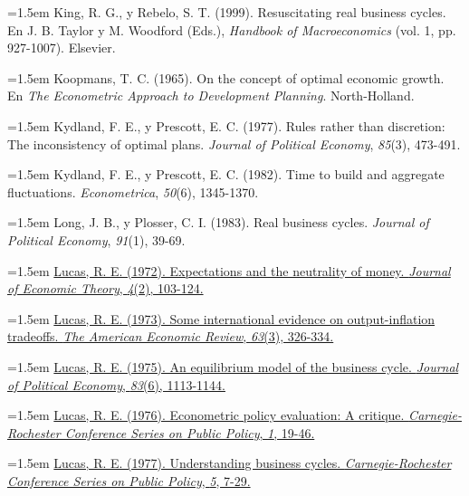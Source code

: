 \documentclass[10pt,a4paper]{article}
\begin{document}
\noindent\hangindent=1.5em King, R. G., y Rebelo, S. T. (1999). Resuscitating real business cycles. En J. B. Taylor y M. Woodford (Eds.), \textit{Handbook of Macroeconomics} (vol. 1, pp. 927-1007). Elsevier.

\noindent\hangindent=1.5em Koopmans, T. C. (1965). On the concept of optimal economic growth. En \textit{The Econometric Approach to Development Planning}. North-Holland.

\noindent\hangindent=1.5em Kydland, F. E., y Prescott, E. C. (1977). Rules rather than discretion: The inconsistency of optimal plans. \textit{Journal of Political Economy}, \textit{85}(3), 473-491.

\noindent\hangindent=1.5em Kydland, F. E., y Prescott, E. C. (1982). Time to build and aggregate fluctuations. \textit{Econometrica}, \textit{50}(6), 1345-1370.

\noindent\hangindent=1.5em Long, J. B., y Plosser, C. I. (1983). Real business cycles. \textit{Journal of Political Economy}, \textit{91}(1), 39-69.

\noindent\hangindent=1.5em \href{https://www.almendron.com/tribuna/wp-content/uploads/2019/01/expectations-and-the-neutrality-of-money-2.pdf}{Lucas, R. E. (1972). Expectations and the neutrality of money. \textit{Journal of Economic Theory}, \textit{4}(2), 103-124.}

\noindent\hangindent=1.5em \href{https://www.aeaweb.org/aer/top20/63.3.326-334.pdf}{Lucas, R. E. (1973). Some international evidence on output-inflation tradeoffs. \textit{The American Economic Review}, \textit{63}(3), 326-334.}

\noindent\hangindent=1.5em \href{https://knowledge.uchicago.edu/record/6014/files/Equilibrium-Model-of-the-Business-Cycle.pdf}{Lucas, R. E. (1975). An equilibrium model of the business cycle. \textit{Journal of Political Economy}, \textit{83}(6), 1113-1144.}

\noindent\hangindent=1.5em \href{https://people.sabanciuniv.edu/atilgan/FE500_Fall2013/2Nov2013_CevdetAkcay/LucasCritique_1976.pdf}{Lucas, R. E. (1976). Econometric policy evaluation: A critique. \textit{Carnegie-Rochester Conference Series on Public Policy}, \textit{1}, 19-46.}

\noindent\hangindent=1.5em \href{https://untdfdinero.wordpress.com/wp-content/uploads/2019/05/lucas-1976.pdf}{Lucas, R. E. (1977). Understanding business cycles. \textit{Carnegie-Rochester Conference Series on Public Policy}, \textit{5}, 7-29.}
\end{document}
